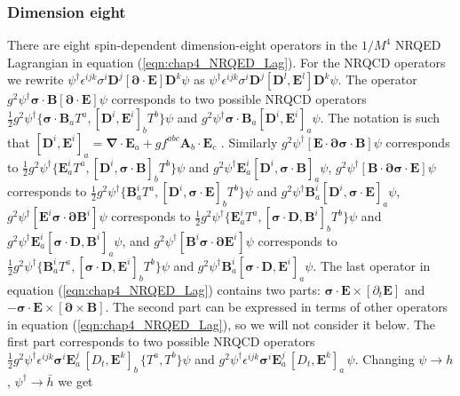 \subsubsection{Dimension eight}\label{subsubsec:Dim8_SD_NRQED_op}
\vspace{-0.2cm}
There are eight spin-dependent dimension-eight operators in the $1/M^4$ NRQED Lagrangian in equation (\ref{eqn:chap4_NRQED_Lag}).  For the NRQCD operators we rewrite $\psi^\dagger\epsilon^{ijk} \sigma^i \bm{D}^j [\bm{\partial}\cdot\bm{E}] \bm{D}^k\psi$ as $\psi^\dagger \epsilon^{ijk} \sigma^i \bm{D}^j [\bm{D}^l,\bm{E}^l] \bm{D}^k\psi$. The operator $g^2\psi^\dagger\bm{\sigma}\cdot\bm{B} [\bm{\partial}\cdot\bm{E}]\psi$ corresponds to two possible NRQCD operators $\frac12g^2\psi^\dagger\{\bm{\sigma}\cdot\bm{B}_aT^a, [\bm{D}^i,\bm{E}^i]_bT^b\}\psi$ and $g^2\psi^\dagger\bm{\sigma}\cdot\bm{B}_a [\bm{D}^i,\bm{E}^i]_a\psi$. The notation is such that $[\bm{D}^i,\bm{E}^i]_a=\bm{\nabla}\cdot\bm{E}_a+gf^{abc}\bm{A}_b\cdot\bm{E}_c$  \cite{Kobach:2017xkw}. Similarly $g^2\psi^\dagger[\bm{E}\cdot\bm{\partial} \bm{\sigma}\cdot\bm{B}]\psi$ corresponds to  $\frac12g^2\psi^\dagger\{\bm{E}^i_aT^a,[\bm{D}^i,\bm{\sigma}\cdot\bm{B}]_bT^b\}\psi$ and $g^2\psi^\dagger\bm{E}^i_a [\bm{D}^i,\bm{\sigma}\cdot\bm{B}]_a\psi$, $g^2\psi^\dagger[\bm{B}\cdot\bm{\partial} \bm{\sigma}\cdot\bm{E}]\psi$ corresponds to  $\frac12g^2\psi^\dagger\{\bm{B}^i_aT^a,[\bm{D}^i,\bm{\sigma}\cdot\bm{E}]_bT^b\}\psi$ and $g^2\psi^\dagger\bm{B}^i_a [\bm{D}^i,\bm{\sigma}\cdot\bm{E}]_a\psi$, $g^2\psi^\dagger[\bm{E}^i \bm{\sigma}\cdot\bm{\partial} \bm{B}^i]\psi$ corresponds to  $\frac12g^2\psi^\dagger\{\bm{E}^i_aT^a,[\bm{\sigma}\cdot\bm{D}, \bm{B}^i]_bT^b\}\psi$ and $g^2\psi^\dagger\bm{E}^i_a[\bm{\sigma}\cdot\bm{D}, \bm{B}^i]_a\psi$, and $g^2\psi^\dagger[\bm{B}^i \bm{\sigma}\cdot\bm{\partial} \bm{E}^i]\psi$ corresponds to  $\frac12g^2\psi^\dagger\{\bm{B}^i_aT^a,[\bm{\sigma}\cdot\bm{D}, \bm{E}^i]_bT^b\}\psi$ and $g^2\psi^\dagger\bm{B}^i_a[\bm{\sigma}\cdot\bm{D}, \bm{E}^i]_a\psi$. The last operator in equation (\ref{eqn:chap4_NRQED_Lag}) contains two parts: $\bm{\sigma}\cdot \bm{E}\times [{\partial_t}\bm{E}]$ and $-\bm{\sigma}\cdot \bm{E}\times[\bm{\partial}\times\bm{B} ]$. The second part can be expressed in terms of other operators in equation (\ref{eqn:chap4_NRQED_Lag}), so we will not consider it below. The first part corresponds to two possible NRQCD operators $\frac12g^2\psi^\dagger\epsilon^{ijk}\bm{\sigma}^i\bm{E}^j_a\, [{D_t},\bm{E}^k]_b\,\{T^a,T^b\}\psi$ and $g^2\psi^\dagger\epsilon^{ijk}\bm{\sigma}^i\bm{E}^j_a\, [{D_t},\bm{E}^k]_a\,\psi$. Changing $\psi\to h$, $\psi^\dagger\to \bar h$ we get 
